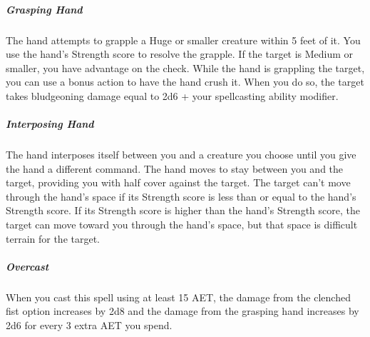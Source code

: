\subparagraph*{Grasping Hand} The hand attempts to grapple a Huge or smaller creature within 5 feet of it. You use the hand's Strength score to resolve the grapple. If the target is Medium or smaller, you have advantage on the check. While the hand is grappling the target, you can use a bonus action to have the hand crush it. When you do so, the target takes bludgeoning damage equal to 2d6 + your spellcasting ability modifier.

\subparagraph*{Interposing Hand} The hand interposes itself between you and a creature you choose until you give the hand a different command. The hand moves to stay between you and the target, providing you with half cover against the target. The target can't move through the hand's space if its Strength score is less than or equal to the hand's Strength score. If its Strength score is higher than the hand's Strength score, the target can move toward you through the hand's space, but that space is difficult terrain for the target.

\subparagraph*{Overcast} When you cast this spell using at least 15 AET, the damage from the clenched fist option increases by 2d8 and the damage from the grasping hand increases by 2d6 for every 3 extra AET you spend.